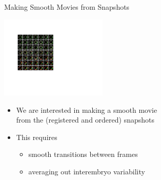 \documentclass[10pt]{beamer}
\begin{document}
\begin{frame}{Making Smooth Movies from Snapshots}

\begin{center}
\includegraphics[width=2in]{fig5}
\end{center}

\begin{itemize}
\item We are interested in making a smooth movie \\ from the  (registered and ordered) snapshots
\item This requires 
\begin{itemize}
\item smooth transitions between frames
\item averaging out interembryo variability
\end{itemize}
\end{itemize}
\end{frame}
\end{document}
